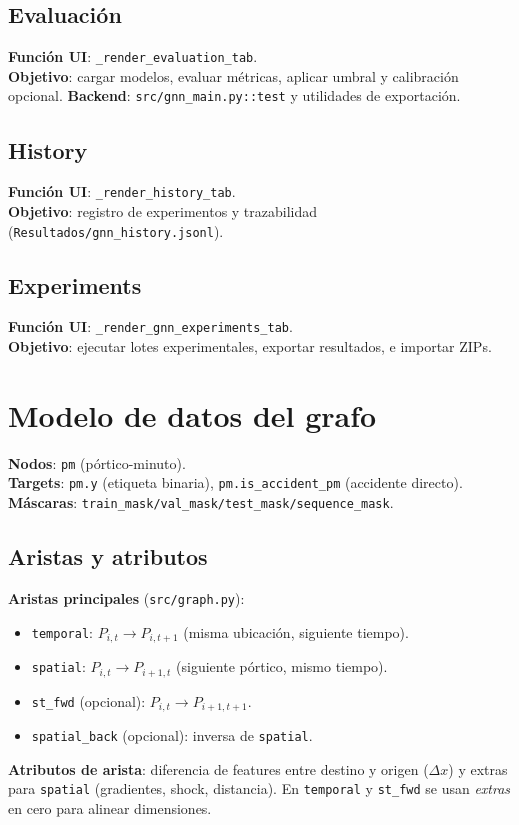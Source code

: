 \subsection{Evaluaci\'on}
\textbf{Funci\'on UI}: \texttt{\_render\_evaluation\_tab}.\\
\textbf{Objetivo}: cargar modelos, evaluar m\'etricas, aplicar umbral y calibraci\'on opcional.
\textbf{Backend}: \texttt{src/gnn\_main.py::test} y utilidades de exportaci\'on.

\subsection{History}
\textbf{Funci\'on UI}: \texttt{\_render\_history\_tab}.\\
\textbf{Objetivo}: registro de experimentos y trazabilidad (\texttt{Resultados/gnn\_history.jsonl}).

\subsection{Experiments}
\textbf{Funci\'on UI}: \texttt{\_render\_gnn\_experiments\_tab}.\\
\textbf{Objetivo}: ejecutar lotes experimentales, exportar resultados, e importar ZIPs.

\section{Modelo de datos del grafo}
\label{sec:grafo}
\textbf{Nodos}: \texttt{pm} (p\'ortico-minuto).\\
\textbf{Targets}: \texttt{pm.y} (etiqueta binaria), \texttt{pm.is\_accident\_pm} (accidente directo).\\
\textbf{M\'ascaras}: \texttt{train\_mask/val\_mask/test\_mask/sequence\_mask}.

\subsection{Aristas y atributos}
\textbf{Aristas principales} (\texttt{src/graph.py}):
\begin{itemize}[leftmargin=*]
  \item \texttt{temporal}: $P_{i,t} \to P_{i,t+1}$ (misma ubicaci\'on, siguiente tiempo).
  \item \texttt{spatial}: $P_{i,t} \to P_{i+1,t}$ (siguiente p\'ortico, mismo tiempo).
  \item \texttt{st\_fwd} (opcional): $P_{i,t} \to P_{i+1,t+1}$.
  \item \texttt{spatial\_back} (opcional): inversa de \texttt{spatial}.
\end{itemize}
\textbf{Atributos de arista}: diferencia de features entre destino y origen ($\Delta x$) y extras
para \texttt{spatial} (gradientes, shock, distancia). En \texttt{temporal} y \texttt{st\_fwd}
se usan \emph{extras} en cero para alinear dimensiones.

